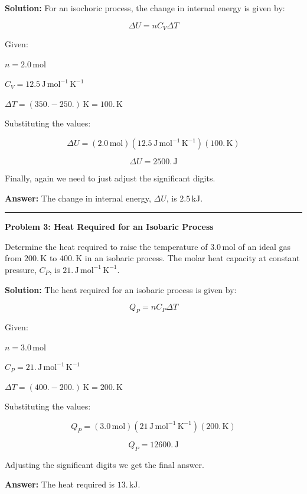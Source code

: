 \documentclass[
  9pt,
]{extbook}
\theoremstyle{definition}
\theoremstyle{definition}
\theoremstyle{definition}
\theoremstyle{definition}
\theoremstyle{remark}
\begin{document}
\textbf{Solution:} For an isochoric process, the change in internal energy is given by:

\[ \Delta U = n C_V \Delta T \]

Given:

\(n = 2.0 \, \text{mol}\)

\(C_V = 12.5 \, \text{J} \, \text{mol}^{-1} \, \text{K}^{-1}\)

\(\Delta T = (350. - 250.) \, \text{K} = 100. \, \text{K}\)

Substituting the values:

\[ \Delta U = (2.0\, \text{mol})(12.5\, \text{J} \, \text{mol}^{-1} \, \text{K}^{-1}) (100.\,\text{K}) \]

\[ \Delta U = 2500. \, \text{J} \]

Finally, again we need to just adjust the significant digits.

\textbf{Answer:} The change in internal energy, \(\Delta U\), is \(2.5 \, \text{kJ}\).

\begin{center}\rule{0.5\linewidth}{0.5pt}\end{center}

\textbf{Problem 3: Heat Required for an Isobaric Process}

Determine the heat required to raise the temperature of \(3.0 \, \text{mol}\) of an ideal gas from \(200. \, \text{K}\) to \(400. \, \text{K}\) in an isobaric process. The molar heat capacity at constant pressure, \(C_P\), is \(21. \, \text{J} \, \text{mol}^{-1} \, \text{K}^{-1}\).

\textbf{Solution:} The heat required for an isobaric process is given by:

\[ Q_P = n C_P \Delta T \]

Given:

\(n = 3.0 \, \text{mol}\)

\(C_P = 21. \, \text{J} \, \text{mol}^{-1} \, \text{K}^{-1}\)

\(\Delta T = (400. - 200.) \, \text{K} = 200. \, \text{K}\)

Substituting the values:

\[ Q_P = (3.0 \, \text{mol})(21 \, \text{J} \, \text{mol}^{-1} \, \text{K}^{-1})(200. \, \text{K}) \]

\[ Q_P = 12600. \, \text{J} \]

Adjusting the significant digits we get the final answer.

\textbf{Answer:} The heat required is \(13. \, \text{kJ}\).
\end{document}
